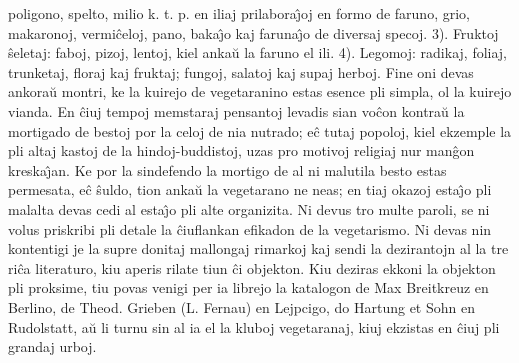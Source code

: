 poligono, spelto, milio k. t. p. en iliaj prilabora\^{\j}oj en formo
de faruno, grio, makaronoj, vermi\^celoj, pano, baka\^{\j}o kaj
faruna\^{\j}o de diversaj specoj. 3). Fruktoj \^seletaj: faboj,
pizoj, lentoj, kiel anka\u u la faruno el ili. 4). Legomoj: radikaj,
foliaj, trunketaj, floraj kaj fruktaj; fungoj, salatoj kaj supaj
herboj. Fine oni devas ankora\u u montri, ke la kuirejo de
vegetaranino estas esence pli simpla, ol la kuirejo vianda. En
\^ciuj tempoj memstaraj pensantoj levadis sian vo\^con kontra\u u la
mortigado de bestoj por la celoj de nia nutrado; e\^c tutaj popoloj,
kiel ekzemple la pli altaj kastoj de la hindoj-buddistoj, uzas pro
motivoj religiaj nur man\^gon kreska\^{\j}an. Ke por la sindefendo
la mortigo de al ni malutila besto estas permesata, e\^c \^suldo,
tion anka\u u la vegetarano ne neas; en tiaj okazoj esta\^{\j}o pli
malalta devas cedi al esta\^{\j}o pli alte organizita. Ni devus tro
multe paroli, se ni volus priskribi pli detale la \^ciuflankan
efikadon de la vegetarismo. Ni devas nin kontentigi je la supre
donitaj mallongaj rimarkoj kaj sendi la dezirantojn al la tre ri\^ca
literaturo, kiu aperis rilate tiun \^ci objekton. Kiu deziras ekkoni
la objekton pli proksime, tiu povas venigi per ia librejo la
katalogon de Max Breitkreuz en Berlino, de Theod. Grieben (L.
Fernau) en Lejpcigo, do Hartung et Sohn en Rudolstatt, a\u u li
turnu sin al ia el la kluboj vegetaranaj, kiuj ekzistas en \^ciuj
pli grandaj urboj.

